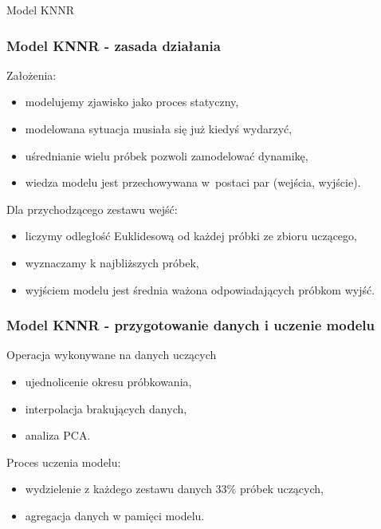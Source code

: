 \documentclass{beamer}
\begin{document}
\begin{frame}[plain,c]
  \begin{center}
    \Huge Model KNNR
  \end{center}
\end{frame}

\begin{frame}
  \frametitle{Model KNNR - zasada działania}
  \begin{block}{Założenia:}
    \begin{itemize}
      \item modelujemy zjawisko jako proces statyczny,
      \item modelowana sytuacja musiała się już kiedyś wydarzyć,
      \item uśrednianie wielu próbek pozwoli zamodelować dynamikę,
      \item wiedza modelu jest przechowywana w~postaci par (wejścia, wyjście).
    \end{itemize}
  \end{block}

  \begin{block}{Dla przychodzącego zestawu wejść:}
    \begin{itemize}
      \item liczymy odległość Euklidesową od każdej próbki ze zbioru uczącego,
      \item wyznaczamy k najbliższych próbek,
      \item wyjściem modelu jest średnia ważona odpowiadających próbkom wyjść. 
    \end{itemize}
  \end{block}
\end{frame}

\begin{frame}
  \frametitle{Model KNNR - przygotowanie danych i uczenie modelu}
  \begin{block}{Operacja wykonywane na danych uczących}
    \begin{itemize}
      \item ujednolicenie okresu próbkowania,
      \item interpolacja brakujących danych,
      \item analiza PCA.
    \end{itemize}
  \end{block}
  \begin{block}{Proces uczenia modelu:}
    \begin{itemize}
      \item wydzielenie z każdego zestawu danych 33\% próbek uczących,
      \item agregacja danych w pamięci modelu.
    \end{itemize}
  \end{block}
\end{frame}
\end{document}
